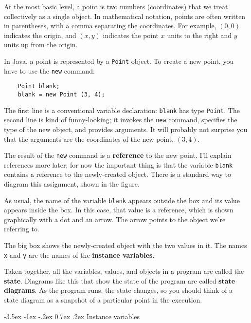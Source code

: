 \documentclass{book}
\makeatletter
\renewcommand{\section}{\@startsection 
    {section} {1} {0mm}%
    {-3.5ex \@plus -1ex \@minus -.2ex}%
    {0.7ex \@plus.2ex}%
    {\normalfont\Large\bfseries}}
\newcommand{\beforefig}{\vspace{1.3\parskip}}
\newcommand{\afterfig}{\vspace{-0.2\parskip}}
\newcommand{\myfig}[1]{
    \beforefig
    \centerline{\epsfig{#1,scale=0.8}}
    \afterfig
}
\makeatother
\begin{document}
At the most basic level, a point is two numbers (coordinates)
that we treat collectively as a single object.  In mathematical
notation, points are often written in parentheses, with a comma
separating the coordinates.  For example, $(0, 0)$ indicates
the origin, and $(x, y)$ indicates the point $x$ units to the
right and $y$ units up from the origin.


In Java, a point is represented by a {\tt Point} object.  To
create a new point, you have to use the {\tt new} command:

\begin{verbatim}
    Point blank;
    blank = new Point (3, 4);
\end{verbatim}
%
The first line is a conventional variable declaration: {\tt blank} has
type {\tt Point}.  The second line is kind of funny-looking; it
invokes the {\tt new} command, specifies the type of the new object,
and provides arguments.  It will probably not surprise you that the
arguments are the coordinates of the new point, $(3, 4)$.


The result of the {\tt new} command is a {\bf reference} to the new
point.  I'll explain references more later; for now the important
thing is that the variable {\tt blank} contains a reference to the
newly-created object.  There is a standard way to diagram this
assignment, shown in the figure.


\myfig{figure=figs/reference.eps}


As usual, the name of the variable {\tt blank} appears outside the box
and its value appears inside the box.  In this case, that value is a
reference, which is shown graphically with a dot and an arrow.  The
arrow points to the object we're referring to.

The big box shows the newly-created object with the two values
in it.  The names {\tt x} and {\tt y} are the names of the {\bf
instance variables}.

Taken together, all the variables, values, and objects in a
program are called the {\bf state}.  Diagrams like this that
show the state of the program are called {\bf state diagrams}.
As the program runs, the state changes, so you should think
of a state diagram as a snapshot of a particular point in the
execution.

\section{Instance variables}
\end{document}
